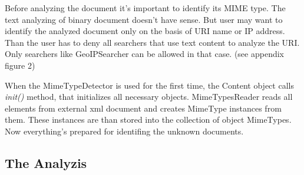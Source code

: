 \documentclass[11pt,a4paper]{article}
\begin{document}

Before analyzing the document it's important to identify its MIME type. The text analyzing of binary document doesn't have sense. But user may want to identify the analyzed document only on the basis of URI name or IP address. Than the user has to deny all searchers that use text content to analyze the URI. Only searchers like GeoIPSearcher can be allowed in that case. (see appendix figure 2)

When the MimeTypeDetector is used for the first time, the Content object calls \emph{init()} method, that initializes all necessary objects. MimeTypesReader reads all elements from external xml document and creates MimeType instances from them. These instances are than stored into the collection of object MimeTypes. Now everything's prepared for identifing the unknown documents.

\subsection{The Analyzis}
\end{document}
